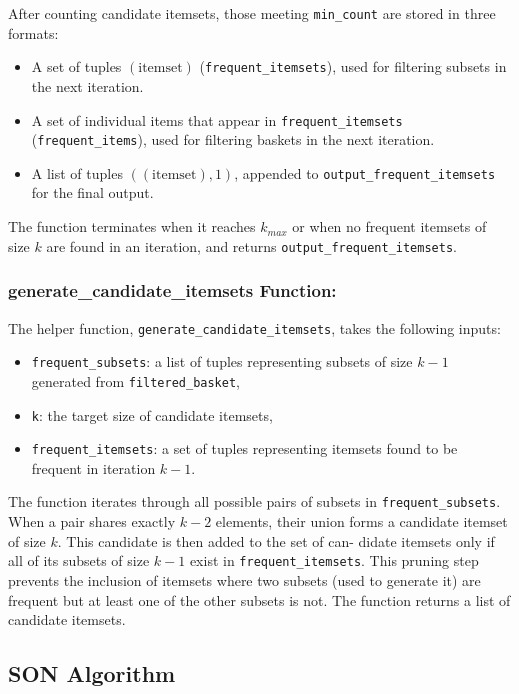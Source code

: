 \documentclass{Class/julia}
\begin{document}
\noindent After counting candidate itemsets, those meeting \texttt{min\_count} are stored in three formats:
  \begin{itemize}
  \item A set of tuples \((\text{itemset})\) (\texttt{frequent\_itemsets}), used for filtering subsets in the next iteration.
  \item A set of individual items that appear in \texttt{frequent\_itemsets} (\texttt{frequent\_items}), used for filtering baskets in the next iteration.   
  \item A list of tuples \(((\text{itemset}), 1)\), appended to \texttt{output\_frequent\_itemsets} for the final output. 
  \end{itemize}
  
\noindent The function terminates when it reaches \( k_{max} \) or when no frequent itemsets of size \( k \) are found in an iteration, and returns \texttt{output\_frequent\_itemsets}.

\subsubsection*{generate\_candidate\_itemsets Function:}

The helper function, \texttt{generate\_candidate\_itemsets}, takes the following inputs:

\begin{itemize}
\item \texttt{frequent\_subsets}: a list of tuples representing subsets of size \( k-1 \) generated from \texttt{filtered\_basket},
\item \texttt{k}: the target size of candidate itemsets,
\item \texttt{frequent\_itemsets}: a set of tuples representing itemsets found to be frequent in iteration \( k-1 \).
\end{itemize}

The function iterates through all possible pairs of subsets in \texttt{frequent\_subsets}. When a pair shares exactly \( k-2 \) elements, their union forms a candidate itemset of size \( k \). This candidate is then added to the set of can- didate itemsets only if all of its subsets of size \( k-1 \) exist in \texttt{frequent\_itemsets}. This pruning step prevents the inclusion of itemsets where two subsets (used to generate it) are frequent but at least one of the other subsets is not. The function returns a list of candidate itemsets.

\subsection{SON Algorithm}
\end{document}
